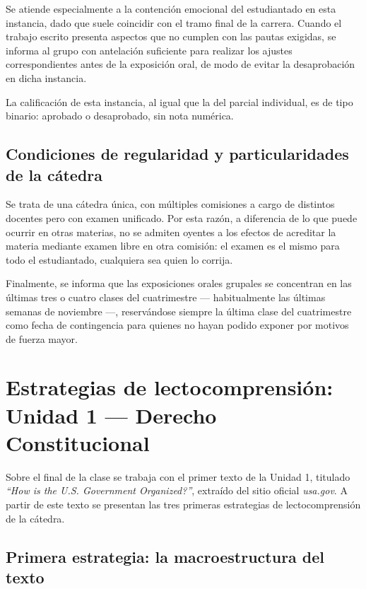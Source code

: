 \documentclass[12pt,oneside]{book}
\begin{document}
Se atiende especialmente a la contención emocional del estudiantado en esta instancia, dado que suele coincidir con el tramo final de la carrera. Cuando el trabajo escrito presenta aspectos que no cumplen con las pautas exigidas, se informa al grupo con antelación suficiente para realizar los ajustes correspondientes antes de la exposición oral, de modo de evitar la desaprobación en dicha instancia.

La calificación de esta instancia, al igual que la del parcial individual, es de tipo binario: aprobado o desaprobado, sin nota numérica.

\section{Condiciones de regularidad y particularidades de la cátedra}

Se trata de una cátedra única, con múltiples comisiones a cargo de distintos docentes pero con examen unificado. Por esta razón, a diferencia de lo que puede ocurrir en otras materias, no se admiten oyentes a los efectos de acreditar la materia mediante examen libre en otra comisión: el examen es el mismo para todo el estudiantado, cualquiera sea quien lo corrija.

Finalmente, se informa que las exposiciones orales grupales se concentran en las últimas tres o cuatro clases del cuatrimestre --- habitualmente las últimas semanas de noviembre ---, reservándose siempre la última clase del cuatrimestre como fecha de contingencia para quienes no hayan podido exponer por motivos de fuerza mayor.

\chapter[Estrategias de lectocomprensión (Unidad 1)]{Estrategias de lectocomprensión: Unidad 1 --- Derecho Constitucional}

Sobre el final de la clase se trabaja con el primer texto de la Unidad 1, titulado \textit{``How is the U.S. Government Organized?''}, extraído del sitio oficial \textit{usa.gov}. A partir de este texto se presentan las tres primeras estrategias de lectocomprensión de la cátedra.

\section{Primera estrategia: la macroestructura del texto}
\end{document}
